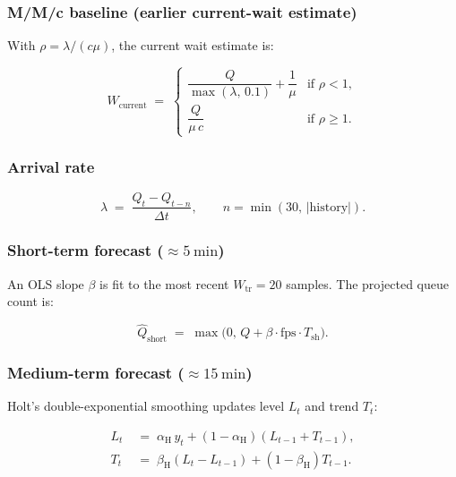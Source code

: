 \subsubsection{M/M/c baseline (earlier current-wait estimate)}
\label{subsubsec:mmc-baseline}

With $\rho = \lambda/(c\mu)$, the current wait estimate is:

\begin{equation}
W_{\text{current}} \;=\;
\begin{cases}
\dfrac{Q}{\max(\lambda,\, 0.1)} + \dfrac{1}{\mu}
  & \text{if } \rho < 1, \\[10pt]
\dfrac{Q}{\mu \, c}
  & \text{if } \rho \geq 1.
\end{cases}
\label{eq:wcurrent}
\end{equation}

\subsubsection{Arrival rate}
\label{subsubsec:arrival-rate}

\begin{equation}
\lambda \;=\; \frac{Q_t - Q_{t-n}}{\Delta t},
\qquad n = \min(30,\, |\text{history}|).
\label{eq:arrival}
\end{equation}

\subsubsection{Short-term forecast ($\approx 5\ \mathrm{min}$)}
\label{subsubsec:short-forecast}

An OLS slope $\beta$ is fit to the most recent $W_{\mathrm{tr}} = 20$
samples. The projected queue count is:

\begin{equation}
\hat{Q}_{\text{short}} \;=\;
\max\!\big(0,\, Q + \beta \cdot \mathrm{fps} \cdot T_{\mathrm{sh}}\big).
\label{eq:qshort}
\end{equation}

\subsubsection{Medium-term forecast ($\approx 15\ \mathrm{min}$)}
\label{subsubsec:holt-forecast}

Holt's double-exponential smoothing updates level $L_t$ and trend
$T_t$:

\begin{align}
L_t &\;=\; \alpha_{\mathrm{H}}\,y_t +
(1-\alpha_{\mathrm{H}})(L_{t-1}+T_{t-1}),
\label{eq:holt-level} \\
T_t &\;=\; \beta_{\mathrm{H}}(L_t - L_{t-1}) +
(1-\beta_{\mathrm{H}})T_{t-1}.
\label{eq:holt-trend}
\end{align}


